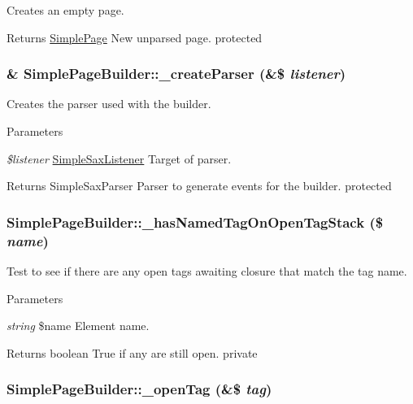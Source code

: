 \label{class_simple_page_builder_afd4eea32d22fe5fb09470d82665879d2}
Creates an empty page. \begin{DoxyReturn}{Returns}
\hyperlink{class_simple_page}{SimplePage} New unparsed page.  protected 
\end{DoxyReturn}
\hypertarget{class_simple_page_builder_af61f0142faa51a5636b4a7f1de3e069a}{
\subsubsection[{\_\-createParser}]{\setlength{\rightskip}{0pt plus 5cm}\& SimplePageBuilder::\_\-createParser (\&\$ {\em listener})}}
\label{class_simple_page_builder_af61f0142faa51a5636b4a7f1de3e069a}
Creates the parser used with the builder. 
\begin{DoxyParams}{Parameters}
\item[{\em \$listener}]\hyperlink{class_simple_sax_listener}{SimpleSaxListener} Target of parser. \end{DoxyParams}
\begin{DoxyReturn}{Returns}
SimpleSaxParser Parser to generate events for the builder.  protected 
\end{DoxyReturn}
\hypertarget{class_simple_page_builder_abb0453d71690ec08dd4286aae3d1d83b}{
\subsubsection[{\_\-hasNamedTagOnOpenTagStack}]{\setlength{\rightskip}{0pt plus 5cm}SimplePageBuilder::\_\-hasNamedTagOnOpenTagStack (\$ {\em name})}}
\label{class_simple_page_builder_abb0453d71690ec08dd4286aae3d1d83b}
Test to see if there are any open tags awaiting closure that match the tag name. 
\begin{DoxyParams}{Parameters}
\item[{\em string}]\$name Element name. \end{DoxyParams}
\begin{DoxyReturn}{Returns}
boolean True if any are still open.  private 
\end{DoxyReturn}
\hypertarget{class_simple_page_builder_a68669a93a330af377812cc921efc94ac}{
\subsubsection[{\_\-openTag}]{\setlength{\rightskip}{0pt plus 5cm}SimplePageBuilder::\_\-openTag (\&\$ {\em tag})}}
